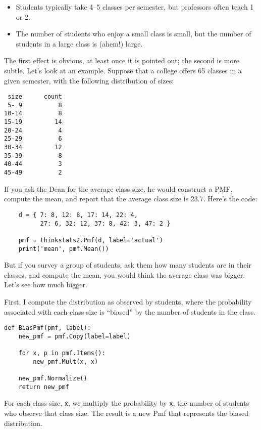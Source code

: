 \begin{itemize}

\item Students typically take 4--5 classes per semester, but
professors often teach 1 or 2.

\item The number of students who enjoy a small class is small,
but the number of students in a large class is (ahem!) large.

\end{itemize}

The first effect is obvious, at least once it is pointed out;
the second is more subtle.  Let's look at an example.  Suppose
that a college offers 65 classes in a given semester, with the
following distribution of sizes:
%
\begin{verbatim}
 size      count
 5- 9          8
10-14          8
15-19         14
20-24          4
25-29          6
30-34         12
35-39          8
40-44          3
45-49          2
\end{verbatim}

If you ask the Dean for the average class size, he would
construct a PMF, compute the mean, and report that the
average class size is 23.7.  Here's the code:

\begin{verbatim}
    d = { 7: 8, 12: 8, 17: 14, 22: 4, 
          27: 6, 32: 12, 37: 8, 42: 3, 47: 2 }

    pmf = thinkstats2.Pmf(d, label='actual')
    print('mean', pmf.Mean())
\end{verbatim}

But if you survey a group of students, ask them how many
students are in their classes, and compute the mean, you would
think the average class was bigger.  Let's see how
much bigger.

First, I compute the
distribution as observed by students, where the probability
associated with each class size is ``biased'' by the number
of students in the class.

\begin{verbatim}
def BiasPmf(pmf, label):
    new_pmf = pmf.Copy(label=label)

    for x, p in pmf.Items():
        new_pmf.Mult(x, x)
        
    new_pmf.Normalize()
    return new_pmf
\end{verbatim}

For each class size, {\tt x}, we multiply the probability by
{\tt x}, the number of students who observe that class size.
The result is a new Pmf that represents the biased distribution.

